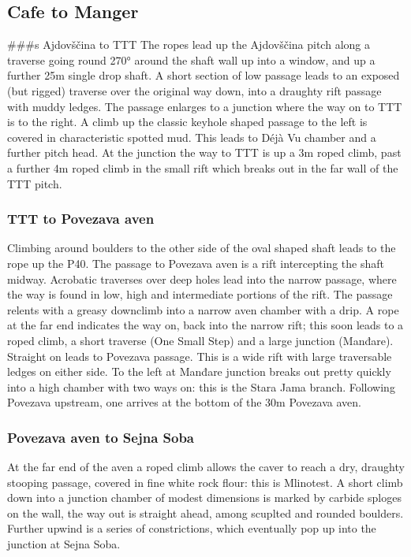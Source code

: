 \hypertarget{cafe-to-manger}{%
\subsection{Cafe to Manger}\label{cafe-to-manger}}

\#\#\#s Ajdovščina to TTT
The ropes lead up the Ajdovščina pitch along a traverse going round 270° around the shaft wall up into a window, and up a further 25m single drop shaft. A short section of low passage leads to an exposed (but rigged) traverse over the original way down, into a draughty rift passage with muddy ledges. The passage enlarges to a junction where the way on to TTT is to the right. A climb up the classic keyhole shaped passage to the left is covered in characteristic spotted mud. This leads to Déjà Vu chamber and a further pitch head. At the junction the way to TTT is up a 3m roped climb, past a further 4m roped climb in the small rift which breaks out in the far wall of the TTT pitch.

\hypertarget{ttt-to-povezava-aven}{%
\subsubsection{TTT to Povezava aven}\label{ttt-to-povezava-aven}}

Climbing around boulders to the other side of the oval shaped shaft leads to the rope up the P40. The passage to Povezava aven is a rift intercepting the shaft midway. Acrobatic traverses over deep holes lead into the narrow passage, where the way is found in low, high and intermediate portions of the rift. The passage relents with a greasy downclimb into a narrow aven chamber with a drip. A rope at the far end indicates the way on, back into the narrow rift; this soon leads to a roped climb, a short traverse (One Small Step) and a large junction (Manđare). Straight on leads to Povezava passage. This is a wide rift with large traversable ledges on either side. To the left at Manđare junction breaks out pretty quickly into a high chamber with two ways on: this is the Stara Jama branch. Following Povezava upstream, one arrives at the bottom of the 30m Povezava aven.

\hypertarget{povezava-aven-to-sejna-soba}{%
\subsubsection{Povezava aven to Sejna Soba}\label{povezava-aven-to-sejna-soba}}

At the far end of the aven a roped climb allows the caver to reach a dry, draughty stooping passage, covered in fine white rock flour: this is Mlinotest. A short climb down into a junction chamber of modest dimensions is marked by carbide sploges on the wall, the way out is straight ahead, among scuplted and rounded boulders. Further upwind is a series of constrictions, which eventually pop up into the junction at Sejna Soba.

